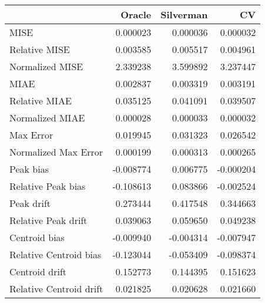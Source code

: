 \begin{tabular}{lrrr}
  \hline
 & Oracle & Silverman & CV \\ 
  \hline
MISE & 0.000023 & 0.000036 & 0.000032 \\ 
  Relative MISE & 0.003585 & 0.005517 & 0.004961 \\ 
  Normalized MISE & 2.339238 & 3.599892 & 3.237447 \\ 
  MIAE & 0.002837 & 0.003319 & 0.003191 \\ 
  Relative MIAE & 0.035125 & 0.041091 & 0.039507 \\ 
  Normalized MIAE & 0.000028 & 0.000033 & 0.000032 \\ 
  Max Error & 0.019945 & 0.031323 & 0.026542 \\ 
  Normalized Max Error & 0.000199 & 0.000313 & 0.000265 \\ 
  Peak bias & -0.008774 & 0.006775 & -0.000204 \\ 
  Relative Peak bias & -0.108613 & 0.083866 & -0.002524 \\ 
  Peak drift & 0.273444 & 0.417548 & 0.344663 \\ 
  Relative Peak drift & 0.039063 & 0.059650 & 0.049238 \\ 
  Centroid bias & -0.009940 & -0.004314 & -0.007947 \\ 
  Relative Centroid bias & -0.123044 & -0.053409 & -0.098374 \\ 
  Centroid drift & 0.152773 & 0.144395 & 0.151623 \\ 
  Relative Centroid drift & 0.021825 & 0.020628 & 0.021660 \\ 
   \hline
\end{tabular}
